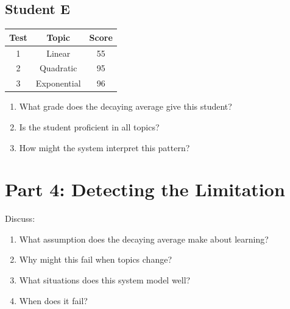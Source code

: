 \documentclass[12pt]{article}
\begin{document}
\subsection*{Student E}

\begin{center}
\begin{tabular}{ccc}
\toprule
Test & Topic & Score \\
\midrule
1 & Linear & 55 \\
2 & Quadratic & 95 \\
3 & Exponential & 96 \\
\bottomrule
\end{tabular}
\end{center}

\begin{enumerate}
    \item What grade does the decaying average give this student?
    \vspace{1.5cm}
    
    \item Is the student proficient in all topics?
    \vspace{1.5cm}
    
    \item How might the system interpret this pattern?
    \vspace{1.5cm}
\end{enumerate}

\section*{Part 4: Detecting the Limitation}

Discuss:

\begin{enumerate}
    \item What assumption does the decaying average make about learning?
    \vspace{1.5cm}
    
    \item Why might this fail when topics change?
    \vspace{1.5cm}
    
    \item What situations does this system model well?
    \vspace{1.5cm}
    
    \item When does it fail?
    \vspace{1.5cm}
\end{enumerate}
\end{document}
